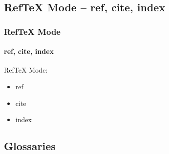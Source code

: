\subsection{RefTeX Mode -- ref, cite, index}


\begin{comment}
*****  [[elisp:(org-cycle)][| ]]  [[elisp:(blee:ppmm:org-mode-toggle)][Nat]] [[elisp:(beginning-of-buffer)][Top]] [[elisp:(delete-other-windows)][(1)]] || /Frame/ *Label=RefTeXMode*  RefTeX Mode ::  [[elisp:(org-cycle)][| ]]
\end{comment}

\begin{frame}[fragile,label=RefTeXMode]
    \frametitle{RefTeX Mode}
    \framesubtitle{ref, cite, index}

    RefTeX Mode:

    \begin{itemize}
    \item ref
    \item cite
    \item index
    \end{itemize}

\end{frame}


\begin{comment}
**  [[elisp:(org-cycle)][| ]] [[elisp:(org-show-subtree)][|=]] [[elisp:(show-children 10)][|V]] [[elisp:(bx:orgm:indirectBufOther)][|>]] [[elisp:(bx:orgm:indirectBufMain)][|I]] [[elisp:(blee:ppmm:org-mode-toggle)][|N]] [[elisp:(org-top-overview)][|O]] [[elisp:(progn (org-shifttab) (org-content))][|C]] [[elisp:(delete-other-windows)][|1]]  /Subsection/   Glossaries ::  [[elisp:(org-cycle)][| ]]
\end{comment}

\subsection{Glossaries}


\begin{comment}
*****  [[elisp:(org-cycle)][| ]]  [[elisp:(blee:ppmm:org-mode-toggle)][Nat]] [[elisp:(beginning-of-buffer)][Top]] [[elisp:(delete-other-windows)][(1)]] || /Frame/ *Label=Glossaries*  Glossaries ::  [[elisp:(org-cycle)][| ]]
\end{comment}

